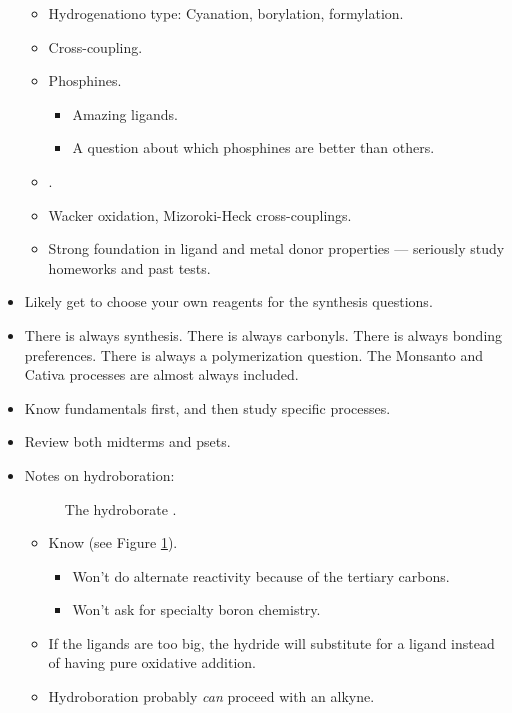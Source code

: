 \documentclass[../notes.tex]{subfiles}
\begin{document}
\begin{itemize}
\begin{itemize}
        \item Hydrogenationo type: Cyanation, borylation, formylation.
        \item Cross-coupling.
        \item Phosphines.
        \begin{itemize}
            \item Amazing ligands.
            \item A question about which phosphines are better than others.
        \end{itemize}
        \item \textcite{bib:HalpernHydrogenation}.
        \item Wacker oxidation, Mizoroki-Heck cross-couplings.
        \item Strong foundation in ligand and metal donor properties --- seriously study homeworks and past tests.
    \end{itemize}
    \item Likely get to choose your own reagents for the synthesis questions.
    \item There is always synthesis. There is always carbonyls. There is always bonding preferences. There is always a polymerization question. The Monsanto and Cativa processes are almost always included.
    \item Know fundamentals first, and then study specific processes.
    \item Review both midterms and psets.
    \item Notes on hydroboration:
    \begin{figure}[H]
        \centering
        \caption{The hydroborate .}
        \label{fig:HBpin}
    \end{figure}
    \begin{itemize}
        \item Know  (see Figure \ref{fig:HBpin}).
        \begin{itemize}
            \item Won't do alternate reactivity because of the tertiary carbons.
            \item Won't ask for specialty boron chemistry.
        \end{itemize}
        \item If the ligands are too big, the hydride will substitute for a ligand instead of having pure oxidative addition.
        \item Hydroboration probably \emph{can} proceed with an alkyne.

\end{itemize}
\end{itemize}
\end{document}
